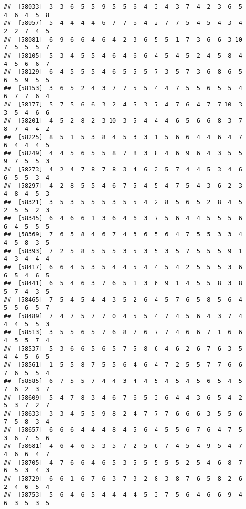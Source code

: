 \documentclass[
]{book}
\begin{document}
\begin{verbatim}
##  [58033]  3  3  6  5  5  9  5  5  6  4  3  4  3  7  4  2  3  6  5  4  6  4  5  8
##  [58057]  5  4  4  4  4  6  7  7  6  4  2  7  7  5  4  5  4  3  4  2  2  7  4  5
##  [58081]  6  9  6  6  4  6  4  2  3  6  5  5  1  7  3  6  6  3 10  7  5  5  5  7
##  [58105]  5  3  4  5  5  4  6  4  6  6  4  5  4  5  2  4  5  8  4  4  5  6  6  7
##  [58129]  6  4  5  5  5  4  6  5  5  5  7  3  5  7  3  6  8  6  5  6  5  9  5  5
##  [58153]  3  6  5  2  4  3  7  7  5  5  4  4  7  5  5  6  5  5  4  6  7  7  6  4
##  [58177]  5  7  5  6  6  3  2  4  5  3  7  4  7  6  4  7  7 10  3  3  5  4  6  6
##  [58201]  4  5  2  8  2  3 10  3  5  4  4  4  6  5  6  6  8  3  7  8  7  4  4  2
##  [58225]  8  5  1  5  3  8  4  5  3  3  1  5  6  6  4  4  6  4  7  6  4  4  4  5
##  [58249]  4  4  5  6  5  5  8  7  8  3  8  4  6  9  6  4  3  5  5  9  7  5  5  3
##  [58273]  4  2  4  7  8  7  8  3  4  6  2  5  7  4  4  5  3  4  6  6  5  5  3  4
##  [58297]  4  2  8  5  5  4  6  7  5  4  5  4  7  5  4  3  6  2  3  4  8  4  5  3
##  [58321]  3  5  3  5  5  5  3  5  5  4  2  8  5  6  5  2  8  4  5  2  5  5  2  3
##  [58345]  6  4  6  6  1  3  6  4  6  3  7  5  6  4  4  5  5  5  6  6  4  5  5  5
##  [58369]  7  6  5  8  4  6  7  4  3  6  5  6  4  7  5  5  3  3  4  4  5  8  3  5
##  [58393]  7  2  5  8  5  5  5  3  5  3  5  3  5  7  5  5  5  9  1  4  3  4  4  4
##  [58417]  6  6  4  5  3  5  4  4  5  4  4  5  4  2  5  5  5  3  6  6  5  4  6  5
##  [58441]  6  5  4  6  3  7  6  5  1  3  6  9  1  4  5  5  8  3  8  5  7  4  3  5
##  [58465]  7  5  4  5  4  4  3  5  2  6  4  5  7  6  5  8  5  6  4  5  5  6  5  7
##  [58489]  7  4  7  5  7  7  0  4  5  5  4  7  4  5  6  4  3  7  4  4  4  5  5  3
##  [58513]  3  5  5  6  5  7  6  8  7  6  7  7  4  6  6  7  1  6  6  4  5  5  7  4
##  [58537]  5  3  6  6  5  6  5  7  5  8  6  4  6  2  6  7  6  3  5  4  4  5  6  5
##  [58561]  1  5  5  8  7  5  5  6  4  6  4  7  2  5  5  7  7  6  6  7  6  5  5  4
##  [58585]  6  7  5  5  7  4  4  3  4  4  5  4  5  4  5  6  5  4  5  7  6  2  3  7
##  [58609]  5  4  7  8  3  4  6  7  6  5  3  6  4  4  3  6  5  4  2  5  3  7  2  7
##  [58633]  3  3  4  5  5  9  8  2  4  7  7  7  6  6  6  3  5  5  6  7  5  8  3  4
##  [58657]  6  6  6  4  4  4  8  4  5  6  4  5  5  6  7  6  4  7  5  3  6  7  5  6
##  [58681]  4  6  4  6  5  3  5  7  2  5  6  7  4  5  4  9  5  4  7  4  6  6  4  7
##  [58705]  4  7  6  6  4  6  5  3  5  5  5  5  5  2  5  4  6  8  7  6  5  3  4  3
##  [58729]  6  6  1  6  7  6  3  7  3  2  8  3  8  7  6  5  8  2  6  2  4  6  5  4
##  [58753]  5  6  4  6  5  4  4  4  4  5  3  7  5  6  4  6  6  9  4  6  3  5  3  5

\end{verbatim}
\end{document}
